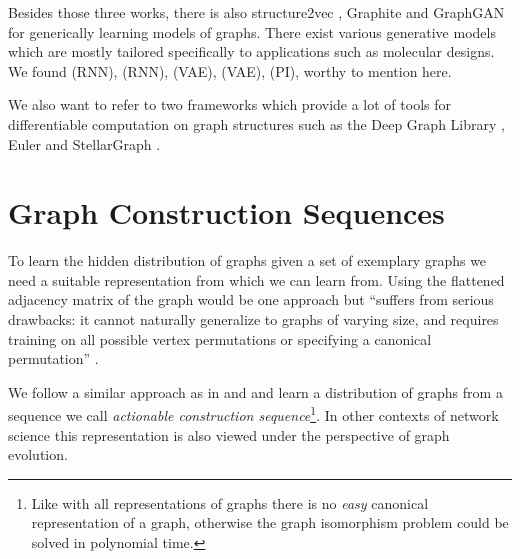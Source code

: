 \documentclass{article}
\begin{document}
Besides those three works, there is also structure2vec \cite{dai2016discriminative}, Graphite \cite{grover2018graphite} and GraphGAN \cite{wang2018graphgan} for generically learning models of graphs.
There exist various generative models which are mostly tailored specifically to applications such as molecular designs.
We found \cite{bjerrum2017molecular} (RNN), \cite{gupta2018generative} (RNN), \cite{jin2018junction} (VAE), \cite{bjerrum2018improving} (VAE), \cite{you2018graph} (PI), \cite{li2019deepchemstable} worthy to mention here.

We also want to refer to two frameworks which provide a lot of tools for differentiable computation on graph structures such as the Deep Graph Library \cite{wang2019dgl}, Euler \cite{alibaba2019} and StellarGraph \cite{stellargraph2018}.






 \section{Graph Construction Sequences}\label{sec:construction-sequences}
To learn the hidden distribution of graphs given a set of exemplary graphs we need a suitable representation from which we can learn from.
Using the flattened adjacency matrix of the graph would be one approach but ``suffers from serious drawbacks:
it cannot naturally generalize to graphs of varying size, and requires training on all possible vertex permutations or specifying a canonical permutation'' \cite{you2018graphrnn}.

We follow a similar approach as in \cite{you2018graphrnn} and \cite{li2018learning} and learn a distribution of graphs from a sequence we call \textit{actionable construction sequence}\footnote{Like with all representations of graphs there is no \textit{easy} canonical representation of a graph, otherwise the graph isomorphism problem could be solved in polynomial time.}.
In other contexts of network science this representation is also viewed under the perspective of graph evolution.
\end{document}
